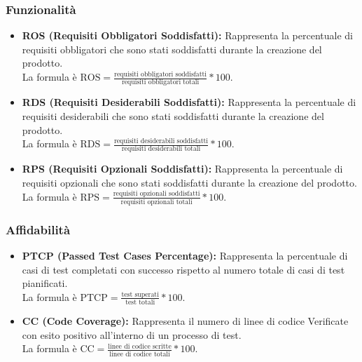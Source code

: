 \subsubsection{Funzionalità}
\begin{itemize}
    \item \textbf{ROS (Requisiti Obbligatori Soddisfatti):} Rappresenta la percentuale di requisiti obbligatori che sono stati soddisfatti durante la creazione del prodotto.\\
    La formula è \( \text{ROS} = \frac{\text{requisiti obbligatori soddisfatti}}{\text{requisiti obbligatori totali}}*100 \).
    \item \textbf{RDS (Requisiti Desiderabili Soddisfatti):} Rappresenta la percentuale di requisiti desiderabili che sono stati soddisfatti durante la creazione del prodotto.\\
    La formula è \( \text{RDS} = \frac{\text{requisiti desiderabili soddisfatti}}{\text{requisiti desiderabili totali}}*100 \).
    \item \textbf{RPS (Requisiti Opzionali Soddisfatti):} Rappresenta la percentuale di requisiti opzionali che sono stati soddisfatti durante la creazione del prodotto.\\
    La formula è \( \text{RPS} = \frac{\text{requisiti opzionali soddisfatti}}{\text{requisiti opzionali totali}}*100 \).
\end{itemize}

\subsubsection{Affidabilità}
\begin{itemize}
    \item \textbf{PTCP (Passed Test Cases Percentage):} Rappresenta la percentuale di casi di test completati con successo rispetto al numero totale di casi di test pianificati.\\
    La formula è \( \text{PTCP} = \frac{\text{test superati}}{\text{test totali}}*100 \).
    \item \textbf{CC (Code Coverage):} Rappresenta il numero di linee di codice Verificate con esito positivo all'interno di un processo di test.\\
    La formula è \( \text{CC} = \frac{\text{linee di codice scritte}}{\text{linee di codice totali}}*100 \).
\end{itemize}

